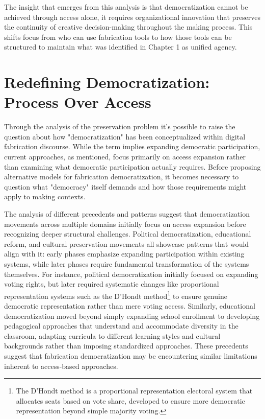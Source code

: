 The insight that emerges from this analysis is that democratization cannot be achieved through access alone, it requires organizational innovation that preserves the continuity of creative decision-making throughout the making process. This shifts focus from who can use fabrication tools to how those tools can be structured to maintain what was identified in Chapter 1 as unified agency. 

\section{Redefining Democratization: Process Over Access}

Through the analysis of the preservation problem it's possible to raise the question about how "democratization" has been conceptualized within digital fabrication discourse. While the term implies expanding democratic participation, current approaches, as mentioned, focus primarily on access expansion rather than examining what democratic participation actually requires. Before proposing alternative models for fabrication democratization, it becomes necessary to question what "democracy" itself demands and how those requirements might apply to making contexts.

\vspace{0.5cm}

The analysis of different precedents and patterns suggest that democratization movements across multiple domains initially focus on access expansion before recognizing deeper structural challenges. Political democratization, educational reform, and cultural preservation movements all showcase patterns that would align with it: early phases emphasize expanding participation within existing systems, while later phases require fundamental transformation of the systems themselves. For instance, political democratization initially focused on expanding voting rights, but later required systematic changes like proportional representation systems such as the D'Hondt method\footnote{The D'Hondt method is a proportional representation electoral system that allocates seats based on vote share, developed to ensure more democratic representation beyond simple majority voting.} to ensure genuine democratic representation rather than mere voting access. Similarly, educational democratization moved beyond simply expanding school enrollment to developing pedagogical approaches that understand and accommodate diversity in the classroom, adapting curricula to different learning styles and cultural backgrounds rather than imposing standardized approaches. These precedents suggest that fabrication democratization may be encountering similar limitations inherent to access-based approaches.

